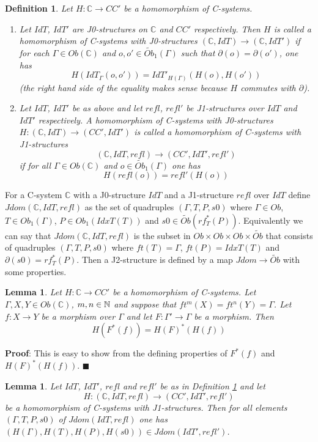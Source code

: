 \documentclass[12pt]{article}
\numberwithin{equation}{section}
\newenvironment{myproof}{{\bf Proof}:}{$\blacksquare$ \vskip 5mm }
\newtheorem{lemma}[proposition]{Lemma}
\newtheorem{definition}[proposition]{Definition}
\newcommand{\llabel}[1]{\label{#1}}
\newcommand{\sr}{\rightarrow}
\newcommand{\nn}{{\mathbb N\rm}}
\newcommand{\wt}{\widetilde}
\newcommand{\aCC}{{\mathbb C}}  %
\begin{document}
%
\begin{definition}
\llabel{2015.04.06.def1} Let $H:\aCC\sr CC'$ be a homomorphism of C-systems.
%
\begin{enumerate}
\item Let $IdT$, $IdT'$ are J0-structures on $\aCC$ and $CC'$ respectively.  Then
  $H$ is called a homomorphism of C-systems with J0-structures $(\aCC,IdT)\sr
  (\aCC,IdT')$ if for each $\Gamma\in Ob(\aCC)$ and $o,o'\in\wt{Ob}_1(\Gamma)$ such
  that $\partial(o)=\partial(o')$, one has
%
$$H(IdT_{\Gamma}(o,o'))=IdT'_{H(\Gamma)}(H(o),H(o'))$$
%
(the right hand side of the equality makes sense because $H$ commutes with
  $\partial$).
% 
\item Let $IdT$, $IdT'$ be as above and let $refl$, $refl'$ be J1-structures
  over $IdT$ and $IdT'$ respectively. A homomorphism of C-systems with
  J0-structures $H:(\aCC,IdT)\sr (CC',IdT')$ is called a homomorphism of
  C-systems with J1-structures
%
$$(\aCC,IdT,refl)\sr (CC',IdT',refl')$$
%
if for all $\Gamma\in Ob(\aCC)$ and $o\in \wt{Ob}_1(\Gamma)$ one has
%
$$H(refl(o))=refl'(H(o))$$
%
\end{enumerate}
\end{definition}
%
For a C-system $\aCC$ with a J0-structure $IdT$ and a J1-structure $refl$ over
$IdT$ define $Jdom(\aCC,IdT,refl)$ as the set of quadruples $(\Gamma,T,P,s0)$
where $\Gamma\in Ob$, $T\in Ob_1(\Gamma)$, $P\in Ob_1(IdxT(T))$ and $s0\in
\wt{Ob}(rf_T^*(P))$. Equivalently we can say that $Jdom(\aCC,IdT,refl)$ is the
subset in $Ob\times Ob\times Ob\times \wt{Ob}$ that consists of quadruples
$(\Gamma,T,P,s0)$ where $ft(T)=\Gamma$, $ft(P)=IdxT(T)$ and
$\partial(s0)=rf_T^*(P)$. Then a J2-structure is defined by a map $Jdom\sr
\wt{Ob}$ with some properties.
%
\begin{lemma}
\llabel{2015.04.06.l3} Let $H:\aCC\sr CC'$ be a homomorphism of C-systems. Let
$\Gamma,X,Y\in Ob(\aCC)$, $m,n\in\nn$ and suppose that
$ft^m(X)=ft^{n}(Y)=\Gamma$. Let $f:X\sr Y$ be a morphism over $\Gamma$ and let
$F:\Gamma'\sr \Gamma$ be a morphism. Then
%
$$H(F^*(f))=H(F)^*(H(f))$$
%
\end{lemma}
%
\begin{myproof}
This is easy to show from the defining properties of $F^*(f)$ and
$H(F)^*(H(f))$.
\end{myproof}
%
%
\begin{lemma}
\llabel{2015.04.06.l2} Let $IdT$, $IdT'$, $refl$ and $refl'$ be as in
Definition \ref{2015.04.06.def1} and let
%
$$H:(\aCC,IdT,refl)\sr (CC',IdT',refl')$$
%
be a homomorphism of C-systems with J1-structures. Then for all elements
$(\Gamma,T,P,s0)$ of $Jdom(IdT,refl)$ one has $(H(\Gamma),H(T),H(P),H(s0))\in
Jdom(IdT',refl')$.
\end{lemma}
\end{document}
